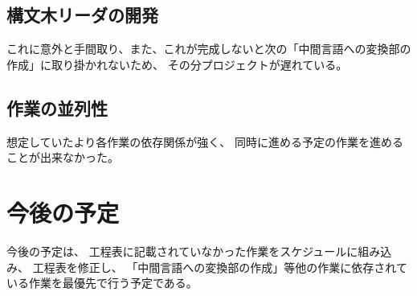\documentclass[a4paper, 10pt, oneside, notitlepage, onecolumn]{jsarticle}
\begin{document}
\subsection{構文木リーダの開発}
これに意外と手間取り、また、これが完成しないと次の「中間言語への変換部の作成」に取り掛かれないため、
その分プロジェクトが遅れている。

\subsection{作業の並列性}
想定していたより各作業の依存関係が強く、
同時に進める予定の作業を進めることが出来なかった。

\section{今後の予定}
今後の予定は、
工程表に記載されていなかった作業をスケジュールに組み込み、
工程表を修正し、
「中間言語への変換部の作成」等他の作業に依存されている作業を最優先で行う予定である。
\end{document}
